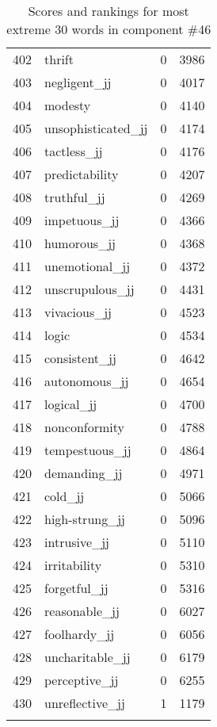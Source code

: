 \begin{longtable}[!htbp]{| rlr@{.}l |}
    402 & thrift & 0 & 3986 \\
    403 & negligent\_jj & 0 & 4017 \\
    404 & modesty & 0 & 4140 \\
    405 & unsophisticated\_jj & 0 & 4174 \\
    406 & tactless\_jj & 0 & 4176 \\
    407 & predictability & 0 & 4207 \\
    408 & truthful\_jj & 0 & 4269 \\
    409 & impetuous\_jj & 0 & 4366 \\
    410 & humorous\_jj & 0 & 4368 \\
    411 & unemotional\_jj & 0 & 4372 \\
    412 & unscrupulous\_jj & 0 & 4431 \\
    413 & vivacious\_jj & 0 & 4523 \\
    414 & logic & 0 & 4534 \\
    415 & consistent\_jj & 0 & 4642 \\
    416 & autonomous\_jj & 0 & 4654 \\
    417 & logical\_jj & 0 & 4700 \\
    418 & nonconformity & 0 & 4788 \\
    419 & tempestuous\_jj & 0 & 4864 \\
    420 & demanding\_jj & 0 & 4971 \\
    421 & cold\_jj & 0 & 5066 \\
    422 & high-strung\_jj & 0 & 5096 \\
    423 & intrusive\_jj & 0 & 5110 \\
    424 & irritability & 0 & 5310 \\
    425 & forgetful\_jj & 0 & 5316 \\
    426 & reasonable\_jj & 0 & 6027 \\
    427 & foolhardy\_jj & 0 & 6056 \\
    428 & uncharitable\_jj & 0 & 6179 \\
    429 & perceptive\_jj & 0 & 6255 \\
    430 & unreflective\_jj & 1 & 1179 \\
    \hline
    \caption{Scores and rankings for most extreme 30 words in component \#46} \\
\end{longtable}
